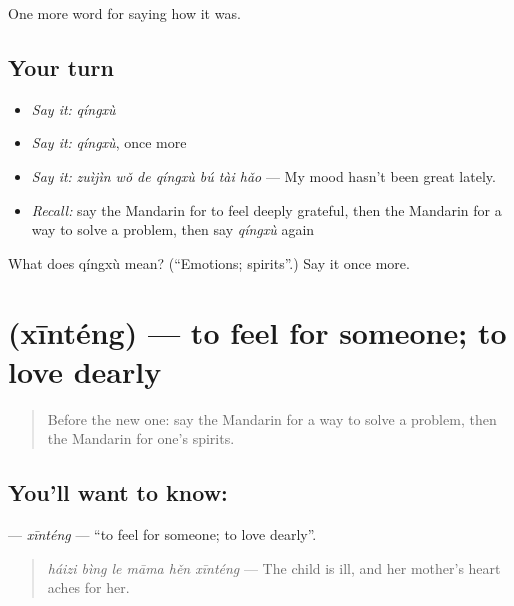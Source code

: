 \begin{grammarlens}[title={What you've built}]
One more word for saying how it was.
\end{grammarlens}

\subsection*{Your turn}
\begin{itemize}
\raggedright
  \item \emph{Say it:} \emph{qíngxù}
  \item \emph{Say it:} \emph{qíngxù}, once more
  \item \emph{Say it:} \emph{zuìjìn wǒ de qíngxù bú tài hǎo} — My mood hasn't been great lately.
  \item \emph{Recall:} say the Mandarin for to feel deeply grateful, then the Mandarin for a way to solve a problem, then say \emph{qíngxù} again
\end{itemize}

\begin{tcolorbox}[breakable,colback=teal!4,colframe=teal!35!black,title={Before you move on}]
What does qíngxù mean? (\textquotedblleft{}Emotions; spirits\textquotedblright{}.) Say it once more.
\end{tcolorbox}
\section[\texorpdfstring{\zh{心疼} (xīnténg)}{心疼 (xīnténg)}]{ (xīnténg) — to feel for someone; to love dearly}

\label{lesson:ZH-C458-xinteng}



\begin{quote}
Before the new one: say the Mandarin for a way to solve a problem, then the Mandarin for one's spirits.
\end{quote}

\subsection*{You'll want to know: }
\textbf{} — \emph{xīnténg} — \textquotedblleft{}to feel for someone; to love dearly\textquotedblright{}.

\begin{quote}
\textbf{} \emph{háizi bìng le māma hěn xīnténg} — The child is ill, and her mother's heart aches for her.
\end{quote}

